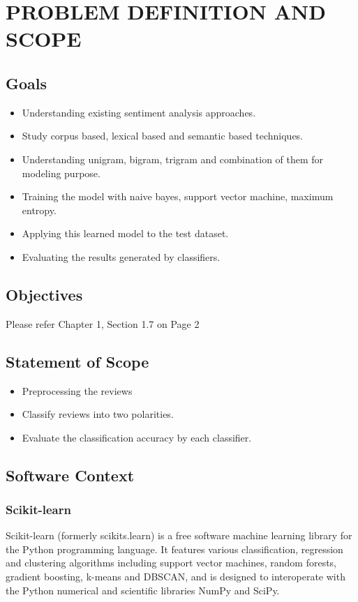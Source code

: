 \documentclass[oneside,a4paper,12pt]{pictreport}
\begin{document}
\chapter{PROBLEM DEFINITION AND SCOPE}

\section{Goals}
\begin{itemize}
\item Understanding existing sentiment analysis approaches.
\item Study corpus based, lexical based and semantic based techniques.
\item Understanding unigram, bigram, trigram and combination of them for modeling purpose.
\item Training the model with naive bayes, support vector machine, maximum entropy.
\item Applying this learned model to the test dataset.
\item Evaluating the results generated by classifiers.
\end{itemize}

\section{Objectives}

Please refer Chapter 1, Section 1.7 on Page 2

\section{Statement of Scope}
\begin{itemize}
\item Preprocessing the reviews
\item Classify reviews into two polarities.
\item Evaluate the classification accuracy by each classifier.
\end{itemize}

\section{Software Context}
\subsection{Scikit-learn} 
Scikit-learn (formerly scikits.learn) is a free software machine learning library for the Python programming language. It features various classification, regression and clustering algorithms including support vector machines, random forests, gradient boosting, k-means and DBSCAN, and is designed to interoperate with the Python numerical and scientific libraries NumPy and SciPy.
\end{document}
